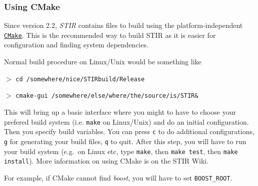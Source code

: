 \documentclass{article}
\def\R2Lurl#1#2{\mbox{\href{#1}{\tt #2}}}
\newcommand{\cmdline}[1]{\par \noindent $>$ \texttt{#1}\par}
\begin{document}
\subsubsection{
Using CMake}
\label{sec:UsingCMake}
Since version 2.2, \textit{STIR} contains files to build using the platform-independent
\R2Lurl{"http://www.cmake.org"}{CMake}. This is the recommended way to build STIR as
it is easier for configuration and finding system dependencies.

Normal build procedure on Linux/Unix would be something like

\cmdline{cd /somewhere/nice/STIRbuild/Release}
\cmdline{cmake-gui /somewhere/else/where/the/source/is/STIR\&}

This will bring up a basic interface where you might to have to choose your prefered
build system (i.e. \texttt{make} on Linux/Unix) and do an initial configuration. Then 
you specify build variables. You can press \texttt{c} to do additional configurations, \texttt{g} for generating
your build files, \texttt{q} to quit. After this step, you will have to run your build system (e.g.\ on Linux etc,
type \texttt{make}, then \texttt{make test}, then \texttt{make install}).
More information on using CMake is on the STIR Wiki.

For example, if CMake cannot find \textit{boost}, you will have to set \texttt{BOOST\_ROOT}. 
\newlength{\MakeTableFirstCol}
\newlength{\MakeTableSecondCol}
\setlength{\MakeTableFirstCol}{1.5in}
\setlength{\MakeTableSecondCol}{\textwidth}
\addtolength{\MakeTableSecondCol}{-\MakeTableFirstCol}
\end{document}
